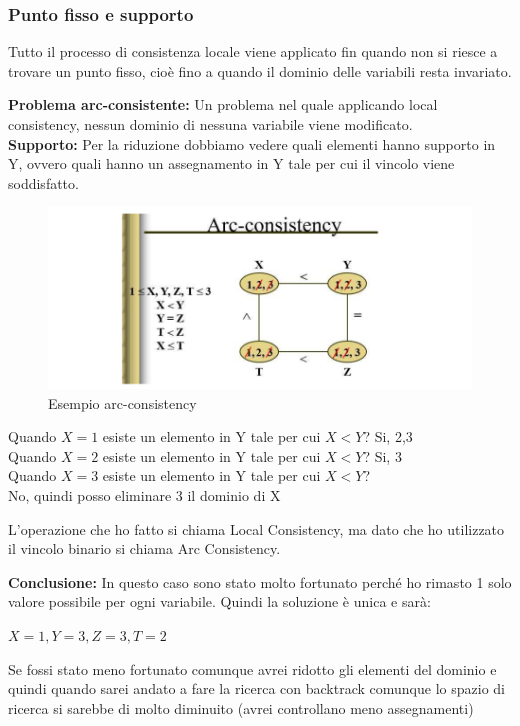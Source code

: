 \subsubsection{Punto fisso e supporto}
Tutto il processo di consistenza locale viene applicato fin quando non si riesce a trovare un punto fisso, cioè fino a quando il dominio delle variabili resta invariato.
\vspace{0.5cm}

\textbf{Problema arc-consistente:} Un problema nel quale applicando local consistency, nessun dominio di nessuna variabile viene modificato. \\
\noindent \textbf{Supporto:} Per la riduzione dobbiamo vedere quali elementi hanno supporto in Y, ovvero quali hanno un assegnamento in Y tale per cui il vincolo viene soddisfatto.
\begin{figure}[H]
    \centering
    \includegraphics[width=13cm, keepaspectratio]{img/Cap3/esempio-arc.png}
    \caption{Esempio arc-consistency}
\end{figure}
\begin{center}
    Quando $X=1$ esiste un elemento in Y tale per cui $X < Y$? Si, 2,3
    \\Quando $X=2$ esiste un elemento in Y tale per cui $X < Y$? Si, 3
    \\Quando $X=3$ esiste un elemento in Y tale per cui $X < Y$?
    \\No, quindi posso eliminare 3 il dominio di X
\end{center}
L'operazione che ho fatto si chiama Local Consistency, ma dato che ho utilizzato il vincolo binario si chiama Arc Consistency.

\noindent \textbf{Conclusione:} In questo caso sono stato molto fortunato perché ho rimasto 1 solo valore possibile per ogni variabile. Quindi la soluzione è unica e sarà:
\begin{center}
    $X = 1, Y = 3, Z = 3, T = 2$
\end{center}
Se fossi stato meno fortunato comunque avrei ridotto gli elementi del dominio e quindi quando sarei andato a fare la ricerca con backtrack comunque lo spazio di ricerca si sarebbe di molto diminuito (avrei controllano meno assegnamenti)
\vspace{0.3cm}

